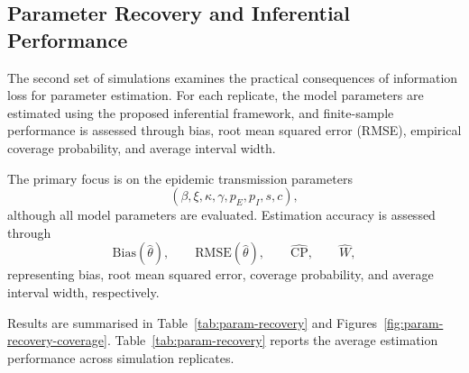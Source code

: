 \documentclass[10pt]{article}
\begin{document}
\subsection{Parameter Recovery and Inferential Performance}
The second set of simulations examines the practical consequences of information loss for parameter estimation. For each replicate, the model parameters are estimated using the proposed inferential framework, and finite-sample performance is assessed through bias, root mean squared error (RMSE), empirical coverage probability, and average interval width.

The primary focus is on the epidemic transmission parameters
\[
(\beta,\xi,\kappa,\gamma,p_E,p_I,s,c),
\]
although all model parameters are evaluated. Estimation accuracy is assessed through
\[
\mathrm{Bias}(\hat{\theta}), \qquad \mathrm{RMSE}(\hat{\theta}), \qquad \widehat{\mathrm{CP}}, \qquad \widehat{W},
\]
representing bias, root mean squared error, coverage probability, and average interval width, respectively.

Results are summarised in Table~\ref{tab:param-recovery} and Figures~\ref{fig:param-recovery-coverage}. Table~\ref{tab:param-recovery} reports the average estimation performance across simulation replicates.
\end{document}
